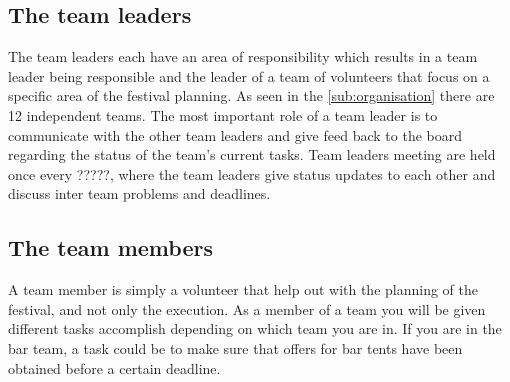 \subsection{The team leaders}
\label{sub:team_leaders}
The team leaders each have an area of responsibility which results in a team leader being
responsible and the leader of a team of volunteers that focus on a specific area of the festival
planning. As seen in the \ref{sub:organisation} there are 12 independent teams. The most important
role of a team leader is to communicate with the other team leaders and give feed back to the board
regarding the status of the team's current tasks. Team leaders meeting are held once every ?????,
where the team leaders give status updates to each other and discuss inter team problems and
deadlines.

\subsection{The team members}
\label{sub:team_members}
A team member is simply a volunteer that help out with the planning of the festival, and not only
the execution. As a member of a team you will be given different tasks accomplish depending on which
team you are in. If you are in the bar team, a task could be to make sure that offers for bar tents
have been obtained before a certain deadline. 

